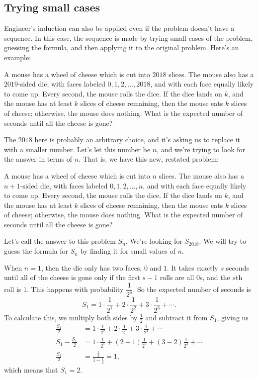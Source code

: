 \documentclass[11pt,paper=letter]{scrartcl}
\begin{document}
\subsection{Trying small cases}

Engineer's induction can also be applied even if the problem doesn't have a sequence. In this case, the sequence is made by trying small cases of the problem, guessing the formula, and then applying it to the original problem. Here's an example:

\begin{exboxed}
  A mouse has a wheel of cheese which is cut into $2018$ slices. The mouse also has a $2019$-sided die, with faces labeled $0,1,2,\ldots, 2018$, and with each face equally likely to come up. Every second, the mouse rolls the dice. If the dice lands on $k$, and the mouse has at least $k$ slices of cheese remaining, then the mouse eats $k$ slices of cheese; otherwise, the mouse does nothing. What is the expected number of seconds until all the cheese is gone?
\end{exboxed}

The $2018$ here is probably an arbitrary choice, and it's asking us to replace it with a smaller number. Let's let this number be $n$, and we're trying to look for the answer in terms of $n$. That is, we have this new, restated problem:

\begin{exboxed}
  A mouse has a wheel of cheese which is cut into $n$ slices. The mouse also has a $n+1$-sided die, with faces labeled $0,1,2,\ldots, n$, and with each face equally likely to come up. Every second, the mouse rolls the dice. If the dice lands on $k$, and the mouse has at least $k$ slices of cheese remaining, then the mouse eats $k$ slices of cheese; otherwise, the mouse does nothing. What is the expected number of seconds until all the cheese is gone?
\end{exboxed}

Let's call the answer to this problem $S_n$. We're looking for $S_{2018}$. We will try to guess the formula for $S_n$ by finding it for small values of $n$.

When $n = 1$, then the die only has two faces, $0$ and $1$. It takes exactly $s$ seconds until all of the cheese is gone only if the first $s-1$ rolls are all $0$s, and the $s$th roll is $1$. This happens with probability $\dfrac{1}{2^s}$. So the expected number of seconds is
\[
  S_1 = 1 \cdot \frac{1}{2^1} + 2 \cdot \frac{1}{2^2} + 3 \cdot \frac{1}{2^3} + \cdots.
\]
To calculate this, we multiply both sides by $\frac{1}{2}$ and subtract it from $S_1$, giving us
\begin{align*}
\frac{S_1}{2} &= 1 \cdot \frac{1}{2^2} + 2 \cdot \frac{1}{2^3} + 3 \cdot \frac{1}{2^4} + \cdots \\
S_1 - \frac{S_1}{2} &= 1 \cdot \frac{1}{2^1} + (2 - 1)\frac{1}{2^2} + (3 - 2)\frac{1}{2^3} + \cdots \\
\frac{S_1}{2} &= \frac{\frac{1}{2}}{1 - \frac{1}{2}} = 1,
\end{align*}
which means that $S_1 = 2$.
\end{document}
